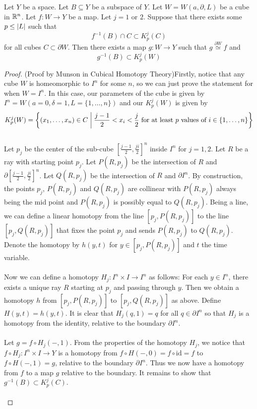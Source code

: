 \documentclass[a4paper]{article}
\begin{document}
\begin{lmm}{}{} Let $Y$ be a space. Let $B\subseteq Y$ be a subspace of $Y$. Let $W=W(a,\partial, L)$ be a cube in $\mathbb{R}^n$. Let $f:W\to Y$ be a map. Let $j=1$ or $2$. Suppose that there exists some $p\leq\abs{L}$ such that $$f^{-1}(B)\cap C\subset K_p^j(C)$$ for all cubes $C\subset\partial W$. Then there exists a map $g:W\to Y$ such that $g\overset{\partial W}{\simeq} f$ and $$g^{-1}(B)\subset K_p^j(W)$$ \tcbline
\begin{proof}
(Proof by Munson in Cubical Homotopy Theory)Firstly, notice that any cube $W$ is homeomorphic to $I^n$ for some $n$, so we can just prove the statement for when $W=I^n$. In this case, our parameters of the cube is given by $I^n=W(a=0,\delta=1,L=\{1,\dots,n\})$ and our $K_p^j(W)$ is given by $$K_p^j(W)=\left\{(x_1,\dots,x_n)\in C\;\bigg{|}\;\frac{j-1}{2}<x_i<\frac{j}{2}\text{ for at least }p\text{ values of }i\in\{1,\dots,n\}\right\}$$~\\

Let $p_j$ be the center of the sub-cube $\left[\frac{j-1}{2},\frac{ji}{2}\right]^n$ inside $I^n$ for $j=1,2$. Let $R$ be a ray with starting point $p_j$. Let $P(R,p_j)$ be the intersection of $R$ and $\partial\left[\frac{j-1}{2},\frac{ji}{2}\right]^n$. Let $Q(R,p_j)$ be the intersection of $R$ and $\partial I^n$. By construction, the points $p_j$, $P(R,p_j)$ and $Q(R,p_j)$ are collinear with $P(R,p_j)$ always being the mid point and $P(R,p_j)$ is possibly equal to $Q(R,p_j)$. Being a line, we can define a linear homotopy from the line $[p_j,P(R,p_j)]$ to the line $[p_j,Q(R,p_j)]$ that fixes the point $p_j$ and sends $P(R,p_j)$ to $Q(R,p_j)$. Denote the homotopy by $h(y,t)$ for $y\in[p_j,P(R,p_j)]$ and $t$ the time variable. \\~\\

Now we can define a homotopy $H_j:I^n\times I\to I^n$ as follows: For each $y\in I^n$, there exists a unique ray $R$ starting at $p_j$ and passing through $y$. Then we obtain a homotopy $h$ from $[p_j,P(R,p_j)]$ to $[p_j,Q(R,p_j)]$ as above. Define $H(y,t)=h(y,t)$. It is clear that $H_j(q,1)=q$ for all $q\in\partial I^n$ so that $H_j$ is a homotopy from the identity, relative to the boundary $\partial I^n$. \\~\\

Let $g=f\circ H_j(-,1)$. From the properties of the homotopy $H_j$, we notice that $f\circ H_j:I^n\times I\to Y$ is a homotopy from $f\circ H(-,0)=f\circ\text{id}=f$ to $f\circ H(-,1)=g$, relative to the boundary $\partial I^n$. Thus we now have a homotopy from $f$ to a map $g$ relative to the boundary. It remains to show that $g^{-1}(B)\subset K_p^j(C)$. \\~\\


\end{proof}
\end{lmm}
\end{document}
